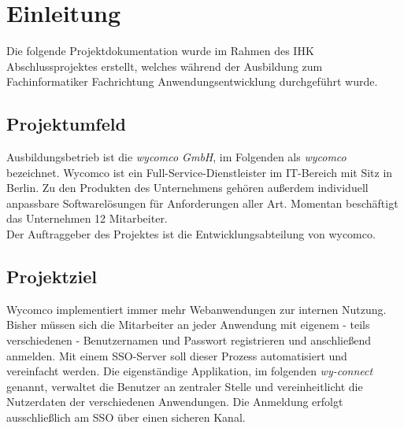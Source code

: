 \section{Einleitung}
\label{sec:Einleitung}
Die folgende Projektdokumentation wurde im Rahmen des IHK Abschlussprojektes erstellt, welches während der Ausbildung zum Fachinformatiker Fachrichtung Anwendungsentwicklung durchgeführt wurde.
\subsection{Projektumfeld} 
\label{sec:Projektumfeld}
Ausbildungsbetrieb ist die \textit{wycomco GmbH}, im Folgenden als \textit{wycomco} bezeichnet. Wycomco ist ein Full-Service-Dienstleister im IT-Bereich mit Sitz in Berlin. Zu den Produkten des Unternehmens gehören außerdem individuell anpassbare Softwarelösungen für Anforderungen aller Art. Momentan beschäftigt das Unternehmen 12 Mitarbeiter. \\
Der Auftraggeber des Projektes ist die Entwicklungsabteilung von wycomco. 
\subsection{Projektziel} 
\label{sec:Projektziel}
Wycomco implementiert immer mehr Webanwendungen zur internen Nutzung. Bisher müssen sich die Mitarbeiter an jeder Anwendung mit eigenem - teils verschiedenen - Benutzernamen und Passwort registrieren und anschließend anmelden.
Mit einem \ac{SSO}-Server soll dieser Prozess automatisiert und vereinfacht werden. Die eigenständige Applikation, im folgenden \textit{wy-connect} genannt, verwaltet die Benutzer an zentraler Stelle und vereinheitlicht die Nutzerdaten der verschiedenen Anwendungen. Die Anmeldung erfolgt ausschließlich am \ac{SSO} über einen sicheren Kanal. 

